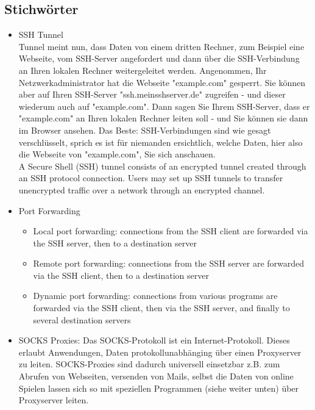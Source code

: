 \documentclass[12pt,a4paper]{article}
\begin{document}
\subsection{Stichwörter}
\begin{itemize}
    \item SSH Tunnel \\
        Tunnel meint nun, dass Daten von einem dritten Rechner, zum Beispiel eine Webseite, vom SSH-Server angefordert 
	  und dann über die SSH-Verbindung an Ihren lokalen Rechner weitergeleitet werden. Angenommen, Ihr Netzwerkadministrator 
	  hat die Webseite "example.com" gesperrt. Sie können aber auf Ihren SSH-Server "ssh.meinsshserver.de" zugreifen - und 
	  dieser wiederum auch auf "example.com". Dann sagen Sie Ihrem SSH-Server, dass er "example.com" an Ihren lokalen 
	  Rechner leiten soll - und Sie können sie dann im Browser ansehen. Das Beste: SSH-Verbindungen sind wie gesagt 
	  verschlüsselt, sprich es ist für niemanden ersichtlich, welche Daten, hier also die Webseite von "example.com",
	  Sie sich anschauen. \\
	   A Secure Shell (SSH) tunnel consists of an encrypted tunnel created through an SSH protocol connection. 
	  Users may set up SSH tunnels to transfer unencrypted traffic over a network through an encrypted channel.
    \item Port Forwarding
    \begin{itemize}
        \item Local port forwarding: connections from the SSH client are forwarded via the SSH server, then to a destination server
	    \item Remote port forwarding: connections from the SSH server are forwarded via the SSH client, then to a destination server
	    \item Dynamic port forwarding: connections from various programs are forwarded via the SSH client, then via the SSH server, 
	  and finally to several destination servers
    \end{itemize}
    \item SOCKS Proxies: Das SOCKS-Protokoll ist ein Internet-Protokoll.
Dieses erlaubt Anwendungen, Daten protokollunabhänging über einen Proxyserver zu leiten.
SOCKS-Proxies sind dadurch universell einsetzbar z.B. zum Abrufen von Webseiten, versenden von Mails,
selbst die Daten von online Spielen lassen sich so mit speziellen Programmen (siehe weiter unten) über Proxyserver leiten.
\end{itemize}
\end{document}
